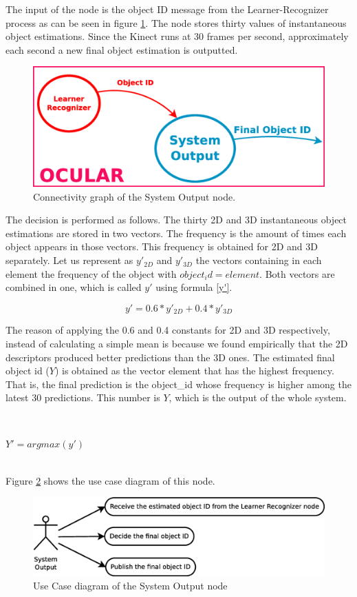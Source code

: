 	The input of the node is the object ID message from the Learner-Recognizer process as can be seen in figure \ref{node_output}.
	The node stores thirty values of instantaneous object estimations. 
	Since the Kinect runs at 30 frames per second, approximately each second a new final object estimation is outputted. 


		\begin{figure}[H]
			\begin{center}
			\includegraphics[width=0.5\linewidth]{img/diagrams/node_output.eps}
			\caption[System Output node I/O]{Connectivity graph of the System Output node.}		
			\label{node_output}
			\end{center}
		\end{figure}

	The decision is performed as follows. 
	The thirty 2D and 3D instantaneous object estimations are stored in two vectors. 
	The frequency is the amount of times each object appears in those vectors. 
	This frequency is obtained for 2D and 3D separately.  
	Let us represent as $y'_{2D}$ and $y'_{3D}$ the vectors containing in each element the frequency of the object with $object_id = element$. 
	Both vectors are combined in one, which is called $y'$ using formula \ref{y'}. 
	\begin{center}
	\begin{equation}
	\label{y'}
	y'=0.6*y'_{2D}+0.4*y'_{3D}
	\end{equation}
	\end{center}
	The reason of applying the 0.6 and 0.4 constants for 2D and 3D respectively, instead of calculating a simple mean is because we found empirically that the 2D descriptors produced better predictions than the 3D ones.
	The estimated final object id ($Y$) is obtained as the vector element that has the highest frequency. 
	That is, the final prediction is the object_id whose frequency is higher among the latest 30 predictions.
	This number is $Y$, which is the output of the whole system. 

	\\
	\begin{center}
		$Y'= argmax(y')$
	\end{center} 
	\\
	Figure \ref{uc_output} shows the use case diagram of this node. 

	\begin{figure}[H]
		\centering
			\includegraphics[scale=0.4]{img/diagrams/uc_system_output.eps}
			\caption[Use case diagram System Output node]{Use Case diagram of the System Output node}
			\label{uc_output}
	\end{figure}
